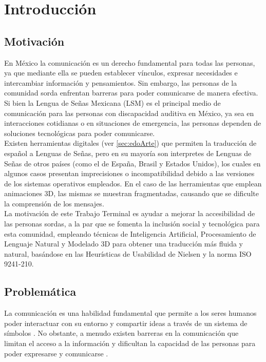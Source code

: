 \chapter{Introducción}
\label{sec:Intro}

\section{Motivación}
En México la comunicación es un derecho fundamental para todas las personas, ya que mediante ella se pueden establecer vínculos, expresar necesidades e intercambiar información y pensamientos. Sin embargo, las personas de la comunidad sorda enfrentan barreras para poder comunicarse de manera efectiva. \\

Si bien la Lengua de Señas Mexicana (LSM) es el principal medio de comunicación para las personas con discapacidad auditiva en México, ya sea en interacciones cotidianas o en situaciones de emergencia, las personas dependen de soluciones tecnológicas para poder comunicarse. \\

Existen herramientas digitales (ver \autoref{sec:edoArte}) que permiten la traducción de español a Lenguas de Señas, pero en su mayoría son interpretes de Lenguas de Señas de otros países (como el de España, Brasil y Estados Unidos), los cuales en algunos casos presentan imprecisiones o incompatibilidad debido a las versiones de los sistemas operativos empleados. En el caso de las herramientas que emplean animaciones 3D, las mismas se muestran fragmentadas, causando que se dificulte la comprensión de los mensajes.\\

La motivación de este Trabajo Terminal es ayudar a mejorar la accesibilidad de las personas sordas, a la par que se fomenta la inclusión social y tecnológica para esta comunidad, empleando técnicas de Inteligencia Artificial, Procesamiento de Lenguaje Natural y Modelado 3D para obtener una traducción más fluida y natural, basándose en las Heurísticas de Usabilidad de Nielsen y la norma ISO 9241-210.\\


\newpage
\section{Problemática}
La comunicación es una habilidad fundamental que permite a los seres humanos poder interactuar con su entorno y compartir ideas a través de un sistema de símbolos \cite{ref1}. No obstante, a menudo existen barreras en la comunicación que limitan el acceso a la información y dificultan la capacidad de las personas para poder expresarse y comunicarse \cite{ref2}. \\

